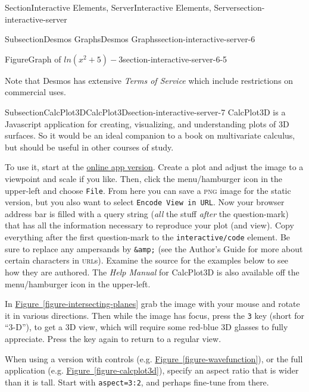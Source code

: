 \documentclass[twoside,10pt,]{article}
\newcommand{\xreffont}{\relax}
\newcommand{\mono}[1]{\texttt{#1}}
\newcommand{\initialism}[1]{\textsc{\MakeLowercase{#1}}}
\newcommand{\pubtitle}[1]{\textsl{#1}}
\numberwithin{equation}{section}
\begin{document}
\begin{sectionptx}{Section}{Interactive Elements, Server}{}{Interactive Elements, Server}{}{}{section-interactive-server}
\begin{subsectionptx}{Subsection}{Desmos Graphs}{}{Desmos Graphs}{}{}{section-interactive-server-6}
\begin{figureptx}{Figure}{Graph of \(ln(x^2+5)-3\)}{section-interactive-server-6-5}{}
\end{figureptx}%
Note that Desmos has extensive \pubtitle{Terms of Service} which include restrictions on commercial uses.%
\end{subsectionptx}
%
%
\typeout{************************************************}
\typeout{************************************************}
%
\begin{subsectionptx}{Subsection}{CalcPlot3D}{}{CalcPlot3D}{}{}{section-interactive-server-7}
%
CalcPlot3D is a Javascript application for creating, visualizing, and understanding plots of 3D surfaces.  So it would be an ideal companion to a book on multivariate calculus, but should be useful in other courses of study.%
\par
To use it, start at the \href{https://c3d.libretexts.org/CalcPlot3D/index.html}{online app version}.  Create a plot and adjust the image to a viewpoint and scale if you like.  Then, click the menu\slash{}hamburger icon in the upper-left and choose \mono{File}.  From here you can save a \initialism{PNG} image for the static version, but you also want to select \mono{Encode View in URL}.  Now your browser address bar is filled with a query string (\emph{all} the stuff \emph{after} the question-mark) that has all the information necessary to reproduce your plot (and view).  Copy everything after the first question-mark to the \mono{interactive/code} element.  Be sure to replace any ampersands by \mono{\&amp;} (see the Author's Guide for more about certain characters in \initialism{URL}s).  Examine the source for the examples below to see how they are authored.  The \pubtitle{Help Manual} for CalcPlot3D is also available off the menu\slash{}hamburger icon in the upper-left.%
\par
In \hyperref[figure-intersecting-planes]{Figure~{\xreffont\ref{figure-intersecting-planes}}} grab the image with your mouse and rotate it in various directions.  Then while the image has focus, press the \mono{3} key (short for ``3-D''), to get a 3D view, which will require some red-blue 3D glasses to fully appreciate.  Press the key again to return to a regular view.%
\par
When using a version with controls (e.g. \hyperref[figure-wavefunction]{Figure~{\xreffont\ref{figure-wavefunction}}}), or the full application (e.g. \hyperref[figure-calcplot3d]{Figure~{\xreffont\ref{figure-calcplot3d}}}), specify an aspect ratio that is wider than it is tall.  Start with \mono{aspect=\textquotedbl{}3:2\textquotedbl{}}, and perhaps fine-tune from there.%

\end{subsectionptx}
\end{sectionptx}
\end{document}

